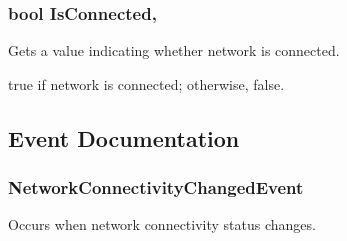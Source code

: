 \subsubsection[{Is\+Connected}]{\setlength{\rightskip}{0pt plus 5cm}bool Is\+Connected\hspace{0.3cm}{\ttfamily [get]}, {}}\label{class_voxel_busters_1_1_native_plugins_1_1_network_connectivity_abac0113ff571c017320394966a1ae6d5}


Gets a value indicating whether network is connected. 

{\ttfamily true} if network is connected; otherwise, {\ttfamily false}.

\subsection{Event Documentation}
\hypertarget{class_voxel_busters_1_1_native_plugins_1_1_network_connectivity_a06cf5d7e4890279aa4a74ba01299e7e5}{}
\subsubsection[{Network\+Connectivity\+Changed\+Event}]{ Network\+Connectivity\+Changed\+Event\hspace{0.3cm}{\ttfamily [static]}}\label{class_voxel_busters_1_1_native_plugins_1_1_network_connectivity_a06cf5d7e4890279aa4a74ba01299e7e5}


Occurs when network connectivity status changes. 


